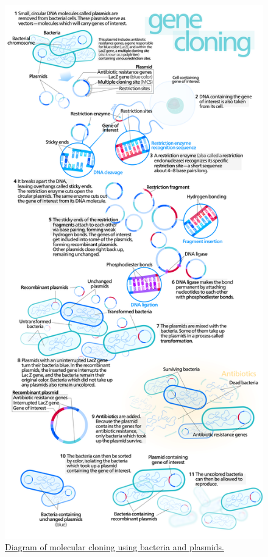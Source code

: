 \begin{figure}

{\centering \includegraphics[width=0.7\linewidth]{./figures/techniques/Gene_cloning} 

}

\caption{\href{https://commons.wikimedia.org/wiki/File:Gene_cloning.svg}{Diagram of molecular cloning using bacteria and plasmids.}}\label{fig:cloningdiagram}
\end{figure}

